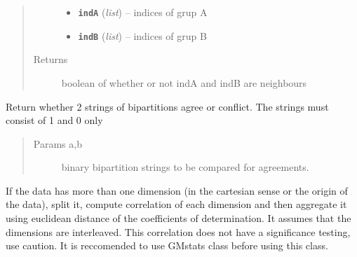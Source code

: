 \documentclass[letterpaper,10pt,english]{sphinxmanual}
\begin{document}
\begin{fulllineitems}
\begin{fulllineitems}
\begin{quote}
\begin{description}
\begin{itemize}
\item {} 
\textbf{\texttt{indA}} (\emph{list}) -- indices of grup A

\item {} 
\textbf{\texttt{indB}} (\emph{list}) -- indices of grup B

\end{itemize}

\item[{Returns}] \leavevmode
boolean of whether or not indA and indB are neighbours

\end{description}\end{quote}

\end{fulllineitems}


\begin{fulllineitems}
\label{Doc:Moduler.SupportClustering.BipartitionAgree}
Return whether 2 strings of bipartitions agree or conflict. The strings must consist of
1 and 0 only
\begin{quote}\begin{description}
\item[{Params a,b}] \leavevmode
binary bipartition strings to be compared for agreements.

\end{description}\end{quote}

\end{fulllineitems}


\begin{fulllineitems}
\label{Doc:Moduler.SupportClustering.DealDimensions}
If the data has more than one dimension (in the cartesian sense or the origin of the data),
split it, compute correlation of each dimension and then aggregate it using euclidean distance
of the coefficients of determination. It assumes that the dimensions are interleaved.
This correlation does not have a significance testing, use caution.
It is reccomended to use GMstats class before using this class.

\end{fulllineitems}



\end{fulllineitems}
\end{document}

